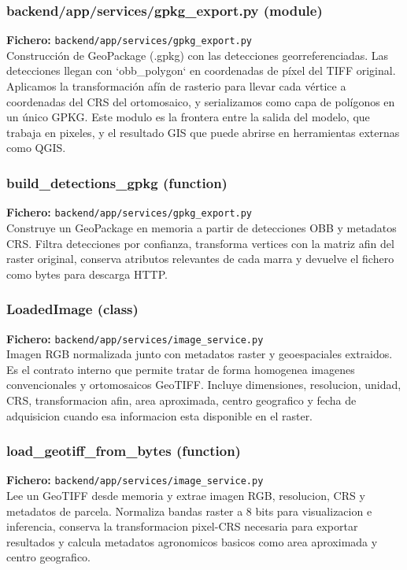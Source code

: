 \subsubsection*{backend/app/services/gpkg\_export.py (module)}
\noindent\textbf{Fichero:} \texttt{backend/app/services/gpkg\_export.py}\\
Construcción de GeoPackage (.gpkg) con las detecciones georreferenciadas. Las detecciones llegan con `obb\_polygon` en coordenadas de píxel del TIFF original. Aplicamos la transformación afín de rasterio para llevar cada vértice a coordenadas del CRS del ortomosaico, y serializamos como capa de polígonos en un único GPKG. Este modulo es la frontera entre la salida del modelo, que trabaja en pixeles, y el resultado GIS que puede abrirse en herramientas externas como QGIS.


\subsubsection*{build\_detections\_gpkg (function)}
\noindent\textbf{Fichero:} \texttt{backend/app/services/gpkg\_export.py}\\
Construye un GeoPackage en memoria a partir de detecciones OBB y metadatos CRS. Filtra detecciones por confianza, transforma vertices con la matriz afin del raster original, conserva atributos relevantes de cada marra y devuelve el fichero como bytes para descarga HTTP.


\subsubsection*{LoadedImage (class)}
\noindent\textbf{Fichero:} \texttt{backend/app/services/image\_service.py}\\
Imagen RGB normalizada junto con metadatos raster y geoespaciales extraidos. Es el contrato interno que permite tratar de forma homogenea imagenes convencionales y ortomosaicos GeoTIFF. Incluye dimensiones, resolucion, unidad, CRS, transformacion afin, area aproximada, centro geografico y fecha de adquisicion cuando esa informacion esta disponible en el raster.


\subsubsection*{load\_geotiff\_from\_bytes (function)}
\noindent\textbf{Fichero:} \texttt{backend/app/services/image\_service.py}\\
Lee un GeoTIFF desde memoria y extrae imagen RGB, resolucion, CRS y metadatos de parcela. Normaliza bandas raster a 8 bits para visualizacion e inferencia, conserva la transformacion pixel-CRS necesaria para exportar resultados y calcula metadatos agronomicos basicos como area aproximada y centro geografico.


